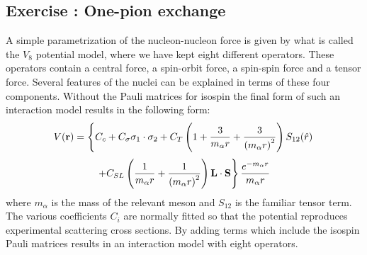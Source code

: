 \documentclass[graybox,sectrefs,envcountresetchap,open=right]{svmonodo}
\newenvironment{doconceexercise}{}{}
\newcounter{doconceexercisecounter}
\begin{document}
\begin{doconceexercise}

\subsection*{Exercise \thedoconceexercisecounter: One-pion exchange}


A simple parametrization of the nucleon-nucleon force is given by what is called the $V_8$ potential model,
where we have kept eight different operators. These operators contain a central force, a spin-orbit force,
a spin-spin force and a tensor force. Several features of the nuclei can be explained in terms of these four components. Without the Pauli matrices for isospin the final form of such an interaction model results in the following form: 
\[
V(\mathbf{r})= \left\{ C_c + C_\mathbf{\sigma} \mathbf{\sigma}_1\cdot\mathbf{\sigma}_2
 + C_T \left( 1 + {3\over m_\alpha r} + {3\over\left(m_\alpha r\right)^2}\right) S_{12} (\hat r)\right. 
\]
\[
\left. + C_{SL} \left( {1\over m_\alpha r} + {1\over \left( m_\alpha r\right)^2}
\right) \mathbf{L}\cdot \mathbf{S}
\right\} \frac{e^{-m_\alpha r}}{m_\alpha r}
\]
where $m_{\alpha}$ is the mass of the relevant meson and
$S_{12}$ is the familiar tensor term. The various coefficients $C_i$ are normally fitted so that the potential reproduces experimental scattering cross sections. By adding terms which include the isospin Pauli matrices 
results in an interaction model with eight operators.


\end{doconceexercise}
\end{document}
